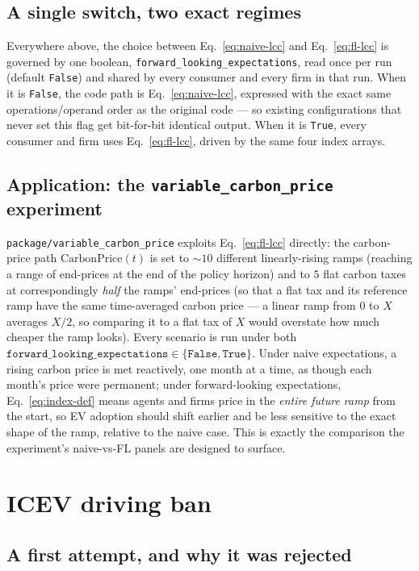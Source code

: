 \documentclass[11pt]{article}
\newcommand{\code}[1]{\texttt{#1}}
\begin{document}
\subsection{A single switch, two exact regimes}

Everywhere above, the choice between Eq.~\eqref{eq:naive-lcc} and
Eq.~\eqref{eq:fl-lcc} is governed by one boolean,
\code{forward\_looking\_expectations}, read once per run (default
\code{False}) and shared by every consumer and every firm in that run. When
it is \code{False}, the code path is Eq.~\eqref{eq:naive-lcc}, expressed
with the exact same operations/operand order as the original code --- so
existing configurations that never set this flag get bit-for-bit identical
output. When it is \code{True}, every consumer and firm uses
Eq.~\eqref{eq:fl-lcc}, driven by the same four index arrays.

\subsection{Application: the \code{variable\_carbon\_price} experiment}

\code{package/variable\_carbon\_price} exploits Eq.~\eqref{eq:fl-lcc}
directly: the carbon-price path $\mathrm{CarbonPrice}(t)$ is set to $\sim 10$
different linearly-rising ramps (reaching a range of end-prices at the end
of the policy horizon) and to $5$ flat carbon taxes at correspondingly
\emph{half} the ramps' end-prices (so that a flat tax and its reference ramp
have the same time-averaged carbon price --- a linear ramp from $0$ to $X$
averages $X/2$, so comparing it to a flat tax of $X$ would overstate how
much cheaper the ramp looks). Every scenario is run under both
$\code{forward\_looking\_expectations}\in\{\code{False},\code{True}\}$. Under
naive expectations, a rising carbon price is met reactively, one month at a
time, as though each month's price were permanent; under forward-looking
expectations, Eq.~\eqref{eq:index-def} means agents and firms price in the
\emph{entire future ramp} from the start, so EV adoption should shift
earlier and be less sensitive to the exact shape of the ramp, relative to
the naive case. This is exactly the comparison the experiment's naive-vs-FL
panels are designed to surface.

\section{ICEV driving ban}
\label{sec:ban}

\subsection{A first attempt, and why it was rejected}
\label{sec:ban-first-attempt}
\end{document}
